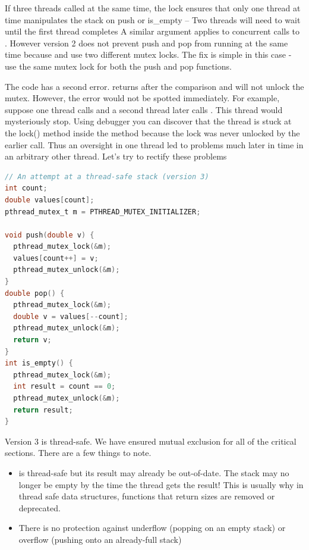 If three threads called  at the same time, the lock  ensures that only one thread at time manipulates the stack on push or is\_empty -- Two threads will need to wait until the first thread completes
A similar argument applies to concurrent calls to .
However version 2 does not prevent push and pop from running at the same time because  and  use two different mutex locks.
The fix is simple in this case - use the same mutex lock for both the push and pop functions.

The code has a second error.
 returns after the comparison and will not unlock the mutex.
However, the error would not be spotted immediately.
For example, suppose one thread calls  and a second thread later calls .
This thread would mysteriously stop.
Using debugger you can discover that the thread is stuck at the lock() method inside the  method because the lock was never unlocked by the earlier  call.
Thus an oversight in one thread led to problems much later in time in an arbitrary other thread.
Let's try to rectify these problems

\begin{lstlisting}[language=C]
// An attempt at a thread-safe stack (version 3)
int count;
double values[count];
pthread_mutex_t m = PTHREAD_MUTEX_INITIALIZER;

void push(double v) {
  pthread_mutex_lock(&m);
  values[count++] = v;
  pthread_mutex_unlock(&m);
}
double pop() {
  pthread_mutex_lock(&m);
  double v = values[--count];
  pthread_mutex_unlock(&m);
  return v;
}
int is_empty() {
  pthread_mutex_lock(&m);
  int result = count == 0;
  pthread_mutex_unlock(&m);
  return result;
}
\end{lstlisting}

Version 3 is thread-safe.
We have ensured mutual exclusion for all of the critical sections.
There are a few things to note.

\begin{itemize}
\item {} is thread-safe but its result may already be out-of-date.
  The stack may no longer be empty by the time the thread gets the result!
  This is usually why in thread safe data structures, functions that return sizes are removed or deprecated.
  \item There is no protection against underflow (popping on an empty stack) or overflow (pushing onto an already-full stack)
\end{itemize}

